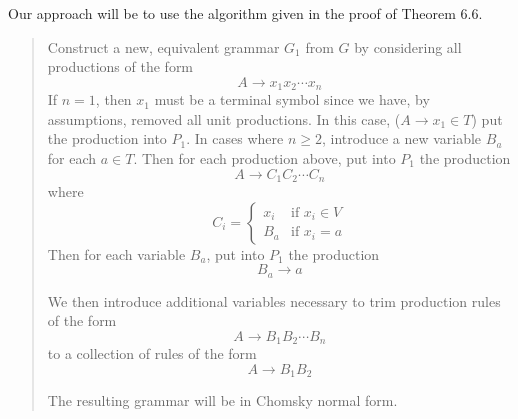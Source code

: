 \documentclass{article}
\begin{document}
Our approach will be to use the algorithm given in the proof of Theorem 6.6.
\begin{quote}
    Construct a new, equivalent grammar $G_1$ from $G$ by considering all productions of the form
    \[A \to x_1 x_2 \cdots x_n\]
    If $n = 1$, then $x_1$ must be a terminal symbol since we have, by assumptions, removed all unit productions.
    In this case, ($A \to x_1 \in T$) put the production into $P_1$.
    In cases where $n \geq 2$, introduce a new variable $B_a$ for each $a \in T$.
    Then for each production above, put into $P_1$ the production
    \[A \to C_1 C_2 \cdots C_n\]
    where
    \[C_i = \begin{cases}
            x_i & \text{if $x_i \in V$} \\
            B_a & \text{if $x_i = a$}
        \end{cases}\]
    Then for each variable $B_a$, put into $P_1$ the production \[B_a \to a\]

    We then introduce additional variables necessary to trim production rules of the form
    \[A \to B_1 B_2 \cdots B_n\]
    to a collection of rules of the form \[A \to B_1 B_2\]

    The resulting grammar will be in Chomsky normal form.
\end{quote}
\end{document}
